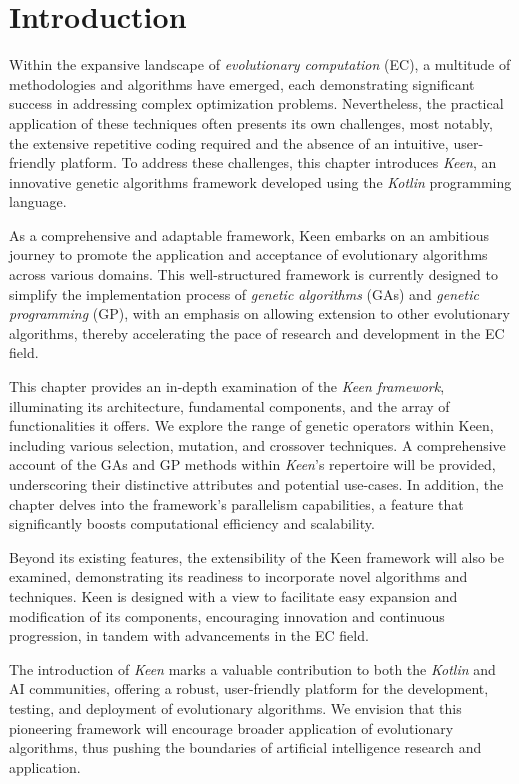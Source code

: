 \section{Introduction}
\label{sec:introduction}
  Within the expansive landscape of \textit{evolutionary computation} (EC), a
  multitude of methodologies and algorithms have emerged, each demonstrating
  significant success in addressing complex optimization problems.
  Nevertheless, the practical application of these techniques often presents
  its own challenges, most notably, the extensive repetitive coding required
  and the absence of an intuitive, user-friendly platform.
  To address these challenges, this chapter introduces \emph{Keen}, an
  innovative genetic algorithms framework developed using the \textit{Kotlin}
  programming language.

  As a comprehensive and adaptable framework, Keen embarks on an ambitious
  journey to promote the application and acceptance of evolutionary algorithms
  across various domains.
  This well-structured framework is currently designed to simplify the
  implementation process of \textit{genetic algorithms} (GAs) and
  \textit{genetic programming} (GP), with an emphasis on allowing extension to
  other evolutionary algorithms, thereby accelerating the pace of research
  and development in the EC field.

  This chapter provides an in-depth examination of the \textit{Keen
  framework}, illuminating its architecture, fundamental components, and the
  array of functionalities it offers.
  We explore the range of genetic operators within Keen, including various
  selection, mutation, and crossover techniques.
  A comprehensive account of the GAs and GP methods within \textit{Keen}'s
  repertoire will be provided, underscoring their distinctive attributes and
  potential use-cases.
  In addition, the chapter delves into the framework's parallelism
  capabilities, a feature that significantly boosts computational efficiency
  and scalability.

  Beyond its existing features, the extensibility of the Keen framework will
  also be examined, demonstrating its readiness to incorporate novel
  algorithms and techniques.
  Keen is designed with a view to facilitate easy expansion and modification
  of its components, encouraging innovation and continuous progression, in
  tandem with advancements in the EC field.

  The introduction of \textit{Keen} marks a valuable contribution to both the
  \textit{Kotlin} and AI communities, offering a robust, user-friendly
  platform for the development, testing, and deployment of evolutionary
  algorithms.
  We envision that this pioneering framework will encourage broader
  application of evolutionary algorithms, thus pushing the boundaries of
  artificial intelligence research and application.